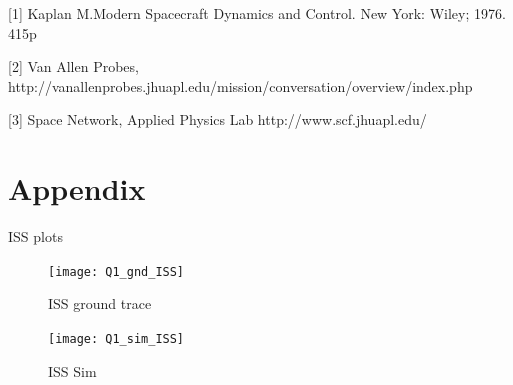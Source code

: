 \documentclass[11pt,a4paper]{article}
\begin{document}












\newpage


[1] Kaplan M.Modern Spacecraft Dynamics and Control. New York: Wiley; 1976. 415p

[2] Van Allen Probes, http://vanallenprobes.jhuapl.edu/mission/conversation/overview/index.php

[3] Space Network, Applied Physics Lab http://www.scf.jhuapl.edu/

\newpage
\section{Appendix}
ISS plots
\begin{figure}[h!]
\centering
\texttt{[image: Q1\_gnd\_ISS]}
\caption{ISS ground trace}
\label{fig:Q1_gnd_ISS}
\end{figure}

\begin{figure}[h!]
\centering
\texttt{[image: Q1\_sim\_ISS]}
\caption{ISS Sim}
\label{fig:Q1_sim_ISS}
\end{figure}
\end{document}
